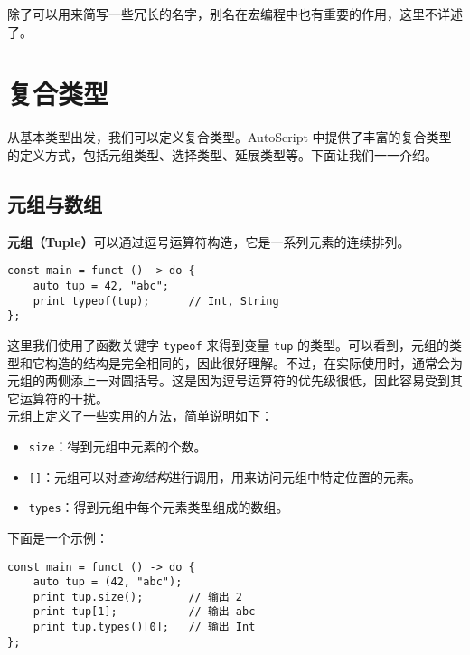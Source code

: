 除了可以用来简写一些冗长的名字，别名在宏编程中也有重要的作用，这里不详述了。


\section{复合类型}

从基本类型出发，我们可以定义复合类型。AutoScript 中提供了丰富的复合类型的定义方式，包括元组类型、选择类型、延展类型等。下面让我们一一介绍。

\subsection{元组与数组}

\textbf{元组（Tuple）}可以通过逗号运算符构造，它是一系列元素的连续排列。

\begin{lstlisting}
const main = funct () -> do {
    auto tup = 42, "abc";
    print typeof(tup);      // Int, String
};
\end{lstlisting}

这里我们使用了函数关键字 \lstinline!typeof! 来得到变量 \lstinline!tup! 的类型。可以看到，元组的类型和它构造的结构是完全相同的，因此很好理解。不过，在实际使用时，通常会为元组的两侧添上一对圆括号。这是因为逗号运算符的优先级很低，因此容易受到其它运算符的干扰。 \\

元组上定义了一些实用的方法，简单说明如下：

\begin{itemize}
    \item \lstinline!size!：得到元组中元素的个数。

    \item \lstinline![]!：元组可以对\emph{查询结构}进行调用，用来访问元组中特定位置的元素。

    \item \lstinline!types!：得到元组中每个元素类型组成的数组。
\end{itemize}

下面是一个示例：

\begin{minipage}[c]{0.95\textwidth}
\vspace{1.0em}
\begin{lstlisting}
const main = funct () -> do {
    auto tup = (42, "abc");
    print tup.size();       // 输出 2
    print tup[1];           // 输出 abc
    print tup.types()[0];   // 输出 Int
};
\end{lstlisting}
\end{minipage}

